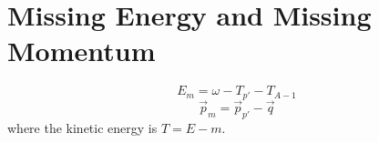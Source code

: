 \section{Missing Energy and Missing Momentum}

\begin{equation}
    E_m = \omega - T_{p'} - T_{A-1}
\end{equation}
\begin{equation}
    \vec{p}_m = \vec{p}_{p'} - \vec{q}
\end{equation}
where the kinetic energy is $T=E-m$.
